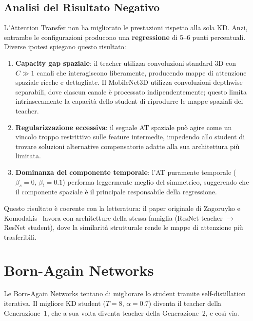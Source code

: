 \subsection{Analisi del Risultato Negativo}

L'Attention Transfer non ha migliorato le prestazioni rispetto alla sola KD. Anzi, entrambe le configurazioni producono una \textbf{regressione} di 5--6 punti percentuali. Diverse ipotesi spiegano questo risultato:

\begin{enumerate}
    \item \textbf{Capacity gap spaziale}: il teacher utilizza convoluzioni standard 3D con $C \gg 1$ canali che interagiscono liberamente, producendo mappe di attenzione spaziale ricche e dettagliate. Il MobileNet3D utilizza convoluzioni depthwise separabili, dove ciascun canale è processato indipendentemente; questo limita intrinsecamente la capacità dello student di riprodurre le mappe spaziali del teacher.
    
    \item \textbf{Regularizzazione eccessiva}: il segnale AT spaziale può agire come un vincolo troppo restrittivo sulle feature intermedie, impedendo allo student di trovare soluzioni alternative compensatorie adatte alla sua architettura più limitata.
    
    \item \textbf{Dominanza del componente temporale}: l'AT puramente temporale ($\beta_s = 0$, $\beta_t = 0.1$) performa leggermente meglio del simmetrico, suggerendo che il componente spaziale è il principale responsabile della regressione.
\end{enumerate}

Questo risultato è coerente con la letteratura: il paper originale di Zagoruyko e Komodakis~\cite{zagoruyko2017paying} lavora con architetture della stessa famiglia (ResNet teacher $\rightarrow$ ResNet student), dove la similarità strutturale rende le mappe di attenzione più trasferibili.

\section{Born-Again Networks}
\label{sec:born_again}

Le Born-Again Networks tentano di migliorare lo student tramite self-distillation iterativa. Il migliore KD student ($T = 8$, $\alpha = 0.7$) diventa il teacher della Generazione~1, che a sua volta diventa teacher della Generazione~2, e così via.

